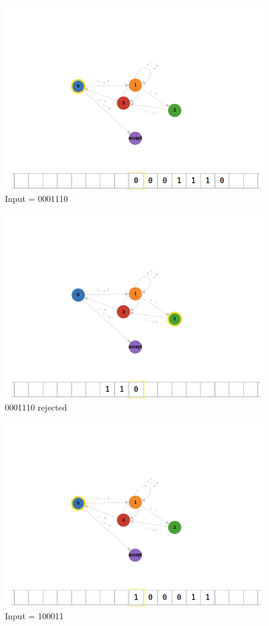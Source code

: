 \documentclass[12pt]{article}
\begin{document}
\begin{figure}[H]
    \caption{Input = 0001110}
    \centering
    \includegraphics[width=12cm]{Q1/0001110.png}  
\end{figure}
\begin{figure}[H]
    \caption{0001110 rejected}
    \centering
    \includegraphics[width=12cm]{Q1/001101o.png}  
\end{figure}
\begin{figure}[H]
    \caption{Input = 100011}
    \centering
    \includegraphics[width=12cm]{Q1/100011.png}
\end{figure}
\end{document}
